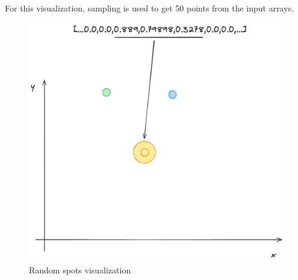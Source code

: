 \documentclass{article}
\begin{document}
For this visualization, sampling is used to get 50 points from the input arrays.

\begin{figure}
    \centering
    \includegraphics[width=0.5\linewidth]{spots.png}
    \caption{Random spots visualization}
    \label{fig:spots}
\end{figure}










\end{document}
